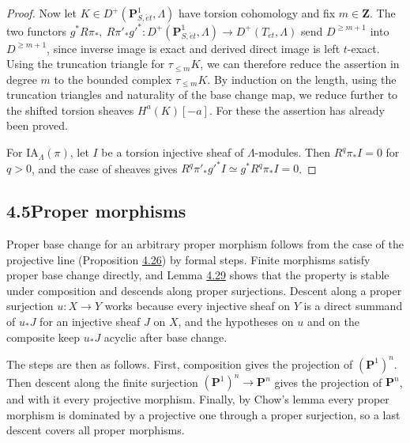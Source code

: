 \documentclass[11pt]{article}
\begin{document}
\begin{proof}[{Proof}]
Now let \(K\in D^+(\mathbf P^1_{S,\acute{e}t},\Lambda)\) have torsion cohomology and fix \(m\in\mathbf Z\). The two functors \(g^*R\pi_*,\ R\pi'_*g'^*:D^+(\mathbf P^1_{S,\acute{e}t},\Lambda)\to
D^+(T_{\acute{e}t},\Lambda)\) send \(D^{\geq m+1}\) into \(D^{\geq m+1}\), since inverse image is exact and derived direct image is left \(t\)-exact. Using the truncation triangle for \(\tau_{\leq m}K\), we can therefore reduce the assertion in degree \(m\) to the bounded complex \(\tau_{\leq m}K\). By induction on the length, using the truncation triangles and naturality of the base change map, we reduce further to the shifted torsion sheaves \(H^a(K)[-a]\). For these the assertion has already been proved.

For \(\mathrm{IA}_\Lambda(\pi)\), let \(I\) be a torsion injective sheaf of \(\Lambda\)-modules. Then \(R^q\pi_*I=0\) for \(q>0\), and the case of sheaves gives \(R^q\pi'_*g'^*I\simeq g^*R^q\pi_*I=0\).
\end{proof}



\subsection*{\texorpdfstring{4.5\quad Proper morphisms}{4.5 Proper morphisms}}
\label{bp78}%
\label{bp79}%
Proper base change for an arbitrary proper morphism follows from the case of the projective line (Proposition \hyperref[bp76]{4.26}) by formal steps. Finite morphisms satisfy proper base change directly, and Lemma \hyperref[bp85]{4.29} shows that the property is stable under composition and descends along proper surjections. Descent along a proper surjection \(u:X\to Y\) works because every injective sheaf on \(Y\) is a direct summand of \(u_*J\) for an injective sheaf \(J\) on \(X\), and the hypotheses on \(u\) and on the composite keep \(u_*J\) acyclic after base change.

The steps are then as follows. First, composition gives the projection of \((\mathbf P^1)^n\). Then descent along the finite surjection \((\mathbf P^1)^n\to\mathbf P^n\) gives the projection of \(\mathbf P^n\), and with it every projective morphism. Finally, by Chow's lemma every proper morphism is dominated by a projective one through a proper surjection, so a last descent covers all proper morphisms.
\end{document}
